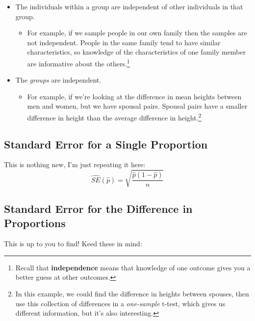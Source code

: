 \documentclass[
  letterpaper,
  DIV=11,
  numbers=noendperiod]{scrreprt}
\providecommand{\tightlist}{%
  \setlength{\itemsep}{0pt}\setlength{\parskip}{0pt}}\usepackage{longtable,booktabs,array}
\begin{document}
\begin{itemize}
\tightlist
\item
  The individuals within a group are independent of other individuals in
  that group.

  \begin{itemize}
  \tightlist
  \item
    For example, if we sample people in our own family then the samples
    are not independent. People in the same family tend to have similar
    characteristics, so knowledge of the characteristics of one family
    member are informative about the others.\footnote{Recall that
      \textbf{independence} means that knowledge of one outcome gives
      you a better guess at other outcomes.}
  \end{itemize}
\item
  The \emph{groups} are independent.

  \begin{itemize}
  \tightlist
  \item
    For example, if we're looking at the difference in mean heights
    between men and women, but we have spousal pairs. Spousal pairs have
    a smaller difference in height than the average difference in
    height.\footnote{In this example, we could find the difference in
      heights between spouses, then use this collection of differences
      in a \emph{one-sample} t-test, which gives us different
      information, but it's also interesting.}
  \end{itemize}
\end{itemize}

\hypertarget{standard-error-for-a-single-proportion}{%
\subsection{Standard Error for a Single
Proportion}\label{standard-error-for-a-single-proportion}}

This is nothing new, I'm just repeating it here: \[
\hat{SE}(\hat p) = \sqrt{\frac{\hat p(1 - \hat p)}{n}}
\]

\hypertarget{standard-error-for-the-difference-in-proportions}{%
\subsection{Standard Error for the Difference in
Proportions}\label{standard-error-for-the-difference-in-proportions}}

This is up to you to find! Keed these in mind:
\end{document}
